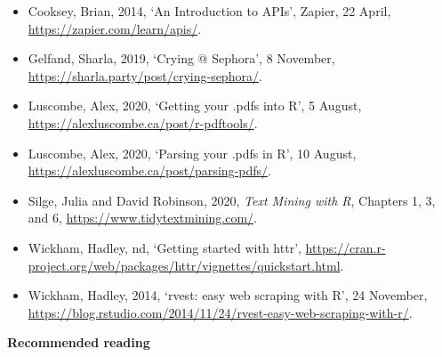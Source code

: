 \documentclass[
]{book}
\providecommand{\tightlist}{%
  \setlength{\itemsep}{0pt}\setlength{\parskip}{0pt}}
\begin{document}
\begin{itemize}
\tightlist
\item
  Cooksey, Brian, 2014, `An Introduction to APIs', Zapier, 22 April, \url{https://zapier.com/learn/apis/}.
\item
  Gelfand, Sharla, 2019, `Crying @ Sephora', 8 November, \url{https://sharla.party/post/crying-sephora/}.
\item
  Luscombe, Alex, 2020, `Getting your .pdfs into R', 5 August, \url{https://alexluscombe.ca/post/r-pdftools/}.
\item
  Luscombe, Alex, 2020, `Parsing your .pdfs in R', 10 August, \url{https://alexluscombe.ca/post/parsing-pdfs/}.
\item
  Silge, Julia and David Robinson, 2020, \emph{Text Mining with R}, Chapters 1, 3, and 6, \url{https://www.tidytextmining.com/}.
\item
  Wickham, Hadley, nd, `Getting started with httr', \url{https://cran.r-project.org/web/packages/httr/vignettes/quickstart.html}.
\item
  Wickham, Hadley, 2014, `rvest: easy web scraping with R', 24 November, \url{https://blog.rstudio.com/2014/11/24/rvest-easy-web-scraping-with-r/}.
\end{itemize}

\textbf{Recommended reading}
\end{document}
